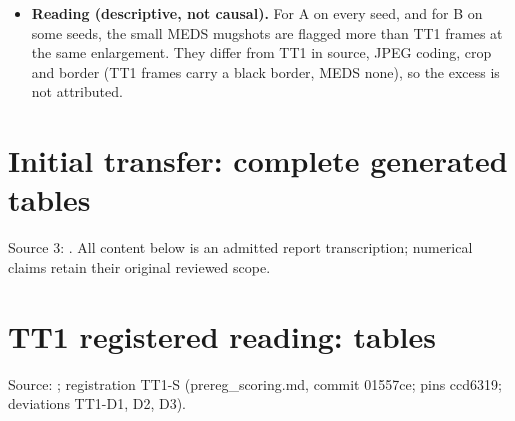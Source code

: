 \documentclass[10pt,twocolumn,letterpaper]{article}
\providecommand{\tightlist}{\setlength{\itemsep}{0pt}\setlength{\parskip}{0pt}}
\begin{document}
\begin{itemize}
\begin{itemize}
    \begin{itemize}
    \tightlist
    \item
      \textbf{A: ``differs''.} MEDS-240 higher on every seed: +0.073, +0.185, +0.011, +0.230, +0.063. Intervals exclude 0 on s403 and s406. B\_s406 {[}0.017, 0.154{]} also excludes 0.
    \item
      \textbf{B: ``mixed''}, 3 of 5 consistent: +0.017, +0.147, +0.035, +0.073, +0.008.
    \item
      \textbf{Sb: ``consistent with enlargement''}, 4 of 5: +0.010, -0.145, -0.049, +0.019, -0.010.
    \item
      \textbf{Sp (printed only):} -0.070, -0.085, -0.057.
    \item
      \textbf{Sensitivity (not registered):} dropping the two sparse bins, A differs on 5 of 5 seeds (+0.14 to +0.48), B stays mixed (+0.02 to +0.29), Sb is consistent on 5 of 5 (\textbar diff\textbar{} \(\le\) 0.024) and Sp is +0.00 to +0.06. The Sb\_s404 `-0.145' and all the negative Sp differences come from 1--2 flagged casia frames in the 2.0--2.5x bin.
    \end{itemize}
  \item
    \textbf{Reading (descriptive, not causal).} For A on every seed, and for B on some seeds, the small MEDS mugshots are flagged more than TT1 frames at the same enlargement. They differ from TT1 in source, JPEG coding, crop and border (TT1 frames carry a black border, MEDS none), so the excess is not attributed.
  \end{itemize}
\end{itemize}
\clearpage
\clearpage
\section{Initial transfer: complete generated tables}
\noindent Source 3: \protect{}. All content below is an admitted report transcription; numerical claims retain their original reviewed scope.

\section{TT1 registered reading: tables}\label{tt1-registered-reading-tables}

Source: \protect{}; registration TT1-S (prereg\_scoring.md, commit 01557ce; pins ccd6319; deviations TT1-D1, D2, D3).
\end{document}
